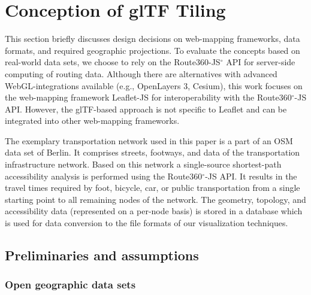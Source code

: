 
\cleardoublepage              %
\chapter{Conception of glTF Tiling}
  This section briefly discusses design decisions on web-mapping frameworks, data
  formats, and required geographic projections. To evaluate the concepts based on
  real-world data sets, we choose to rely on the Route360-JS$^\circ$ API for server-side
  computing of routing data. Although there are alternatives with advanced WebGL-integrations
  available (e.g., OpenLayers 3, Cesium), this work focuses on the web-mapping framework
  Leaflet-JS for interoperability with the Route360$^\circ$-JS API. However, the
  glTF-based approach is not specific to Leaflet and can be integrated into other
  web-mapping frameworks.\par
  The exemplary transportation network used in this paper is a part of an OSM data
  set of Berlin. It comprises streets, footways, and data of the transportation
  infrastructure network. Based on this network a single-source shortest-path accessibility
  analysis \cite{Meyer2001} is performed using the Route360$^\circ$-JS API. It results in
  the travel times required by foot, bicycle, car, or public transportation from a
  single starting point to all remaining nodes of the network. The geometry, topology,
  and accessibility data (represented on a per-node basis) is stored in a database which
  is used for data conversion to the file formats of our visualization techniques.\par

  \section{Preliminaries and assumptions}
    \subsection{Open geographic data sets}
